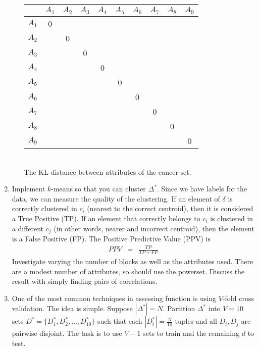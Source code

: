 \documentclass{article}
\begin{document}
\begin{enumerate}
\begin{enumerate}
\begin{center}
\begin{tabular}{c|ccccccccc}
     &$A_1$ & $A_2$ & $A_3$ & $A_4$ & $A_5$ & $A_6$ & $A_7$ & $A_8$ & $A_9$\\ \hline
$A_1$& 0	&  &  &  &  &  &  &  & \\ 
$A_2$&  & 0  &  &  &  &  &  &  & \\
$A_3$& &  &  0 &  &  &  &  &  & \\ 
$A_4$& &  &  &  0 &  &  &  &  & \\ 
$A_5$& &  &  &  & 0  &  &  &  & \\ 
$A_6$& &  &  &  &  &  0 &  &  & \\ 
$A_7$& &  &  &  &  &   & 0 &  & \\ 
$A_8$& &  &  &  &  &  &   & 0 & \\ 
$A_9$& &  &  &  &  &  &  &   &0 \\  
\end{tabular}\[\] 
\\ The KL distance between attributes of the cancer set.
\end{center}

 \end{enumerate} 
  \item  Implement $k$-means so that you can cluster $\Delta^*$.   Since we have labels for the data, we can measure the quality of the clustering.  If an element of $\delta$ is correctly clustered in $c_i$ (nearest to the correct centroid), then it is considered a True Positive (TP).  If an element that correctly belongs to $c_i$ is clustered in a different $c_j$ (in other words, nearer and incorrect centroid), then the element is a False Positive (FP). The Positive Predictive Value (PPV) is\begin{eqnarray}
  PPV &=& \frac{TP}{TP+FP}\label{tp} \end{eqnarray}  Investigate varying the number of blocks as well as the attributes used.  There are a modest number of attributes, so should use the powerset.  Discuss the result with simply finding pairs of correlations.
\item One of the most common techniques in assessing function is using $V$-fold cross validation.  The idea is simple.  Suppose $|\Delta^*| = N$.  Partition $\Delta^*$ into $V=10$ sets $D^* = \{D_1^*,D_2^*,\ldots, D_{10}^*\}$ such that each $|D_i^*| = \frac{N}{10}$ tuples and all $D_i, D_j$ are pairwise disjoint.  The task is to use $V-1$ sets to train and the remaining $d$ to test.  


\end{enumerate}
\end{document}
